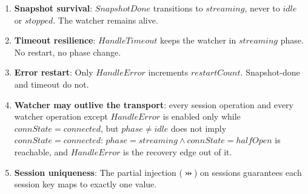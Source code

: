 \documentclass[a4paper,10pt,fleqn]{article}
\begin{document}
\begin{enumerate}
    the running system, not as a gap in the property itself.  The pre-fix
    defect is reproduced,
    for $k = talk$, by replacing the $Subscribe$ guard with the
    ``re-subscribe only when the handle is \texttt{None}'' condition
    $subGen(talk) = 0$: the same CTL formula then goes \textbf{FALSE},
    with probcli returning the counterexample $connState = connected
    \land generation = 3 \land subGen(talk) = 2$ --- a live client whose
    talk SUB is stuck on the superseded generation $2$, never re-opened.
    That state \emph{is} biff-9la, and the same defect shape --- a guard
    that checks ``never subscribed'' instead of ``subscribed to a
    superseded generation'' --- would equally strand $inboxNotify$ or
    $kvWatch$ were the fix not applied uniformly across the family.

  \item \textbf{Snapshot survival}: $SnapshotDone$ transitions to
    $streaming$, never to $idle$ or $stopped$.  The watcher
    remains alive.

  \item \textbf{Timeout resilience}: $HandleTimeout$ keeps the
    watcher in $streaming$ phase.  No restart, no phase change.

  \item \textbf{Error restart}: Only $HandleError$ increments
    $restartCount$.  Snapshot-done and timeout do not.

  \item \textbf{Watcher may outlive the transport}: every session
    operation and every watcher operation except $HandleError$ is
    enabled only while $connState = connected$, but $phase \neq idle$
    does not imply $connState = connected$: $phase = streaming \land
    connState = halfOpen$ is reachable, and $HandleError$ is the
    recovery edge out of it.

  \item \textbf{Session uniqueness}: The partial injection
    ($\pinj$) on sessions guarantees each session key maps to
    exactly one value.
\end{enumerate}
\end{document}
